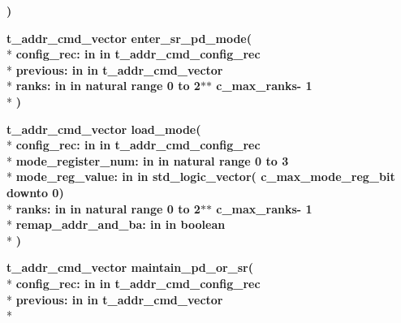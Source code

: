 \begin{DoxyCompactItemize}
{\bfseries  )} 
\item 
{\bfseries {\bfseries \textcolor{vhdlchar}{t\+\_\+addr\+\_\+cmd\+\_\+vector}\textcolor{vhdlchar}{ }}} {\bf enter\+\_\+sr\+\_\+pd\+\_\+mode}{\bfseries  ( }\\*
{\bfseries \textcolor{vhdlchar}{config\+\_\+rec\+: }\textcolor{stringliteral}{in }\textcolor{vhdlchar}{in t\+\_\+addr\+\_\+cmd\+\_\+config\+\_\+rec}}\\*
{\bfseries \textcolor{vhdlchar}{previous\+: }\textcolor{stringliteral}{in }\textcolor{vhdlchar}{in t\+\_\+addr\+\_\+cmd\+\_\+vector}}\\*
{\bfseries \textcolor{vhdlchar}{ranks\+: }\textcolor{stringliteral}{in }\textcolor{vhdlchar}{in natural   range  0 to  2$\ast$$\ast$   c\+\_\+max\+\_\+ranks-\/ 1}}\\*
{\bfseries  )} 
\item 
{\bfseries {\bfseries \textcolor{vhdlchar}{t\+\_\+addr\+\_\+cmd\+\_\+vector}\textcolor{vhdlchar}{ }}} {\bf load\+\_\+mode}{\bfseries  ( }\\*
{\bfseries \textcolor{vhdlchar}{config\+\_\+rec\+: }\textcolor{stringliteral}{in }\textcolor{vhdlchar}{in t\+\_\+addr\+\_\+cmd\+\_\+config\+\_\+rec}}\\*
{\bfseries \textcolor{vhdlchar}{mode\+\_\+register\+\_\+num\+: }\textcolor{stringliteral}{in }\textcolor{vhdlchar}{in natural   range  0 to  3}}\\*
{\bfseries \textcolor{vhdlchar}{mode\+\_\+reg\+\_\+value\+: }\textcolor{stringliteral}{in }\textcolor{vhdlchar}{in std\+\_\+logic\+\_\+vector(   c\+\_\+max\+\_\+mode\+\_\+reg\+\_\+bit downto  0)}}\\*
{\bfseries \textcolor{vhdlchar}{ranks\+: }\textcolor{stringliteral}{in }\textcolor{vhdlchar}{in natural   range  0 to  2$\ast$$\ast$   c\+\_\+max\+\_\+ranks-\/ 1}}\\*
{\bfseries \textcolor{vhdlchar}{remap\+\_\+addr\+\_\+and\+\_\+ba\+: }\textcolor{stringliteral}{in }\textcolor{vhdlchar}{in boolean}}\\*
{\bfseries  )} 
\item 
{\bfseries {\bfseries \textcolor{vhdlchar}{t\+\_\+addr\+\_\+cmd\+\_\+vector}\textcolor{vhdlchar}{ }}} {\bf maintain\+\_\+pd\+\_\+or\+\_\+sr}{\bfseries  ( }\\*
{\bfseries \textcolor{vhdlchar}{config\+\_\+rec\+: }\textcolor{stringliteral}{in }\textcolor{vhdlchar}{in t\+\_\+addr\+\_\+cmd\+\_\+config\+\_\+rec}}\\*
{\bfseries \textcolor{vhdlchar}{previous\+: }\textcolor{stringliteral}{in }\textcolor{vhdlchar}{in t\+\_\+addr\+\_\+cmd\+\_\+vector}}\\*

\end{DoxyCompactItemize}
